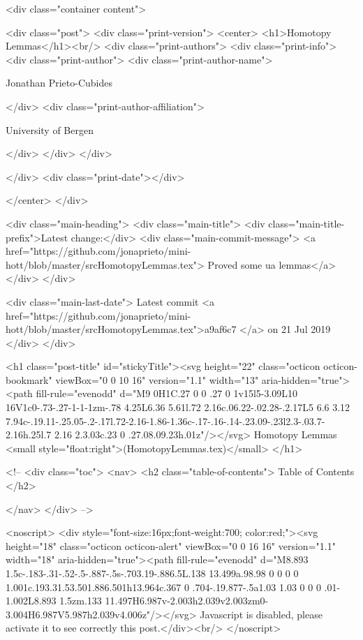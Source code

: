       <div class="container content">
        







<div class="post">
  <div class="print-version">
    <center>
      <h1>Homotopy Lemmas</h1><br/>
        <div class="print-authors">
          <div class="print-info">
            <div class="print-author">
              <div class="print-author-name">
                
                  Jonathan Prieto-Cubides
                
              </div>
              <div class="print-author-affiliation">
                
                  University of Bergen
                
                </div>
            </div>
          </div>
          
          
        </div>
        <div class="print-date"></div>
        
        
    </center>
  </div>

  
  <div class="main-heading">
    <div class="main-title">
      <div class="main-title-prefix">Latest change:</div>
      <div class="main-commit-message">
            <a href="https://github.com/jonaprieto/mini-hott/blob/master/srcHomotopyLemmas.tex">
              Proved some ua lemmas</a>
      </div>
    </div>

    <div class="main-last-date">
      Latest commit <a href="https://github.com/jonaprieto/mini-hott/blob/master/srcHomotopyLemmas.tex">a9af6c7 </a> on  21 Jul 2019
    </div>
  </div>
  

  <h1 class="post-title" id="stickyTitle"><svg height="22" class="octicon octicon-bookmark" viewBox="0 0 10 16" version="1.1" width="13" aria-hidden="true"><path fill-rule="evenodd" d="M9 0H1C.27 0 0 .27 0 1v15l5-3.09L10 16V1c0-.73-.27-1-1-1zm-.78 4.25L6.36 5.61l.72 2.16c.06.22-.02.28-.2.17L5 6.6 3.12 7.94c-.19.11-.25.05-.2-.17l.72-2.16-1.86-1.36c-.17-.16-.14-.23.09-.23l2.3-.03.7-2.16h.25l.7 2.16 2.3.03c.23 0 .27.08.09.23h.01z"/></svg> Homotopy Lemmas <small style="float:right">(HomotopyLemmas.tex)</small>
  </h1>

  <!-- 
  <div class="toc">
    <nav>
    <h2 class="table-of-contents"> Table of Contents </h2>
      

    </nav>
  </div>
   -->

  <noscript>
  <div style="font-size:16px;font-weight:700; color:red;"><svg height="18" class="octicon octicon-alert" viewBox="0 0 16 16" version="1.1" width="18" aria-hidden="true"><path fill-rule="evenodd" d="M8.893 1.5c-.183-.31-.52-.5-.887-.5s-.703.19-.886.5L.138 13.499a.98.98 0 0 0 0 1.001c.193.31.53.501.886.501h13.964c.367 0 .704-.19.877-.5a1.03 1.03 0 0 0 .01-1.002L8.893 1.5zm.133 11.497H6.987v-2.003h2.039v2.003zm0-3.004H6.987V5.987h2.039v4.006z"/></svg> Javascript is disabled, please activate it to see correctly this post.</div><br/>
  </noscript>

